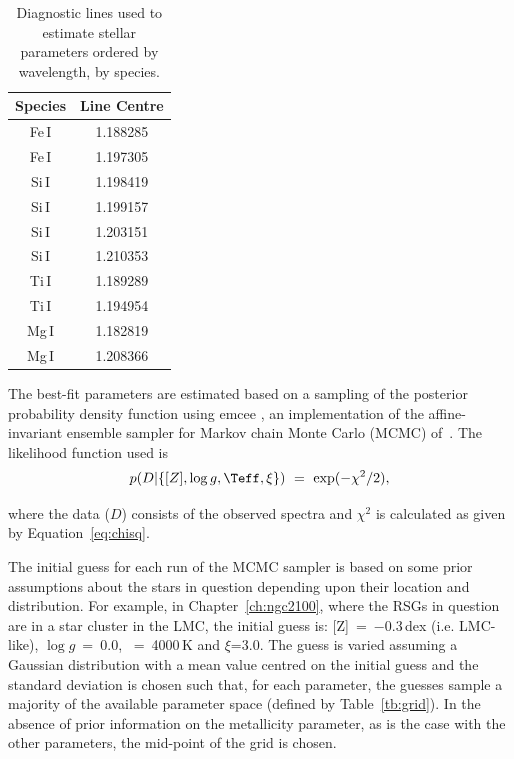 \begin{table}
\caption[Diagnostic lines]{Diagnostic lines used to estimate stellar parameters ordered by wavelength, by species.\label{tb:lines}}
\scriptsize
\begin{center}
\begin{tabular}{cc}
 \hline
 \hline
Species & Line Centre \\
 \hline
Fe\,I & 1.188285 \\
Fe\,I & 1.197305 \\
Si\,I & 1.198419 \\
Si\,I & 1.199157 \\
Si\,I & 1.203151 \\
Si\,I & 1.210353 \\
Ti\,I & 1.189289 \\
Ti\,I & 1.194954 \\
Mg\,I & 1.182819\\
Mg\,I & 1.208366\\
 \hline
\end{tabular}
\end{center}
\end{table}

The best-fit parameters are estimated based on a sampling of the posterior probability density function using {\sc emcee}
\cite{2013PASP..125..306F},
an implementation of the affine-invariant ensemble sampler for Markov chain Monte Carlo (MCMC) of~\cite{2010CAMCS.5..65G}.
The likelihood function used is
\begin{equation}
    p(D|\{[Z], \log g, \Teff, \xi\})~=~\exp(-\chi^{2}/2), \label{eq:like}
\end{equation}

\noindent where the data ($D$) consists of the observed spectra and $\chi^{2}$ is calculated as given by Equation~\ref{eq:chisq}.

The initial guess for each run of the MCMC sampler is based on some prior assumptions about the stars in question depending upon their location and distribution.
For example, in Chapter~\ref{ch:ngc2100}, where the RSGs in question are in a star cluster in the LMC, the initial guess is: [Z]~=~$-$0.3\,dex (i.e. LMC-like), $\log g$~=~0.0, \Teff~=~4000\,K and $\xi$=3.0.
The guess is varied assuming a Gaussian distribution with a mean value centred on the initial guess and the standard deviation is chosen such that, for each parameter, the guesses sample a majority of the available parameter space (defined by Table~\ref{tb:grid}).
In the absence of prior information on the metallicity parameter, as is the case with the other parameters, the mid-point of the grid is chosen.

